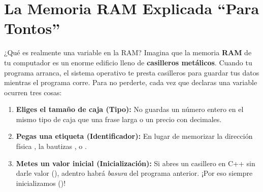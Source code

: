 \documentclass[11pt,letterpaper]{article}
\begin{document}

\tableofcontents
\vspace{6pt}

\section{La Memoria RAM Explicada ``Para Tontos''}

\begin{paratontos}{¿Qué es realmente una variable en la RAM?}
Imagina que la memoria \textbf{RAM} de tu computador es un enorme edificio lleno de \textbf{casilleros metálicos}. Cuando tu programa arranca, el sistema operativo te presta casilleros para guardar tus datos mientras el programa corre. Para no perderte, cada vez que declaras una variable ocurren tres cosas:
\begin{enumerate}
  \item \textbf{Eliges el tamaño de caja (Tipo):} No guardas un número entero en el mismo tipo de caja que una frase larga o un precio con decimales.
  \item \textbf{Pegas una etiqueta (Identificador):} En lugar de memorizar la dirección física , la bautizas ,  o .
  \item \textbf{Metes un valor inicial (Inicialización):} Si abres un casillero en C++ sin darle valor (), adentro habrá \emph{basura} del programa anterior. ¡Por eso siempre inicializamos ()!
\end{enumerate}
\end{paratontos}
\end{document}
